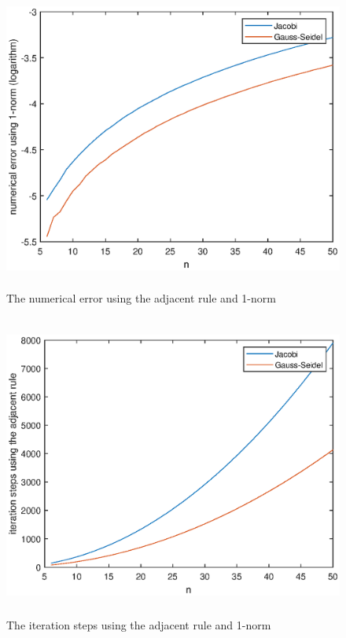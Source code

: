 \documentclass[UTF8,a4paper,10pt]{ctexart}
\begin{document}
\begin{figure}[ht]
    \centering
    \includegraphics[width=14cm,height=10cm]{2.1_error_adjacent_1.eps}
    \caption{The numerical error using the adjacent rule and 1-norm}
\end{figure}
\begin{figure}[ht]
    \centering
    \includegraphics[width=14cm,height=10cm]{2.1_steps_adjacent_1.eps}
    \caption{The iteration steps using the adjacent rule and 1-norm}
\end{figure}
\end{document}
